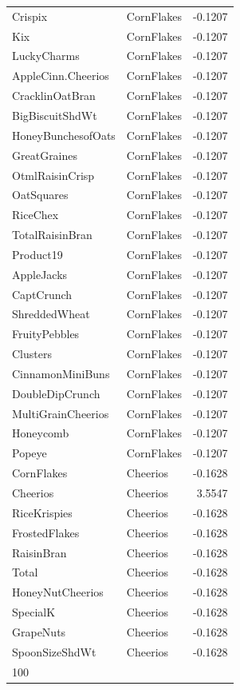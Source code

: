 \begin{longtable}{llr}
Crispix & CornFlakes & -0.1207 \\
Kix & CornFlakes & -0.1207 \\
LuckyCharms & CornFlakes & -0.1207 \\
AppleCinn.Cheerios & CornFlakes & -0.1207 \\
CracklinOatBran & CornFlakes & -0.1207 \\
BigBiscuitShdWt & CornFlakes & -0.1207 \\
HoneyBunchesofOats & CornFlakes & -0.1207 \\
GreatGraines & CornFlakes & -0.1207 \\
OtmlRaisinCrisp & CornFlakes & -0.1207 \\
OatSquares & CornFlakes & -0.1207 \\
RiceChex & CornFlakes & -0.1207 \\
TotalRaisinBran & CornFlakes & -0.1207 \\
Product19 & CornFlakes & -0.1207 \\
AppleJacks & CornFlakes & -0.1207 \\
CaptCrunch & CornFlakes & -0.1207 \\
ShreddedWheat & CornFlakes & -0.1207 \\
FruityPebbles & CornFlakes & -0.1207 \\
Clusters & CornFlakes & -0.1207 \\
CinnamonMiniBuns & CornFlakes & -0.1207 \\
DoubleDipCrunch & CornFlakes & -0.1207 \\
MultiGrainCheerios & CornFlakes & -0.1207 \\
Honeycomb & CornFlakes & -0.1207 \\
Popeye & CornFlakes & -0.1207 \\
CornFlakes & Cheerios & -0.1628 \\
Cheerios & Cheerios & 3.5547 \\
RiceKrispies & Cheerios & -0.1628 \\
FrostedFlakes & Cheerios & -0.1628 \\
RaisinBran & Cheerios & -0.1628 \\
Total & Cheerios & -0.1628 \\
HoneyNutCheerios & Cheerios & -0.1628 \\
SpecialK & Cheerios & -0.1628 \\
GrapeNuts & Cheerios & -0.1628 \\
SpoonSizeShdWt & Cheerios & -0.1628 \\
100%

\end{longtable}
